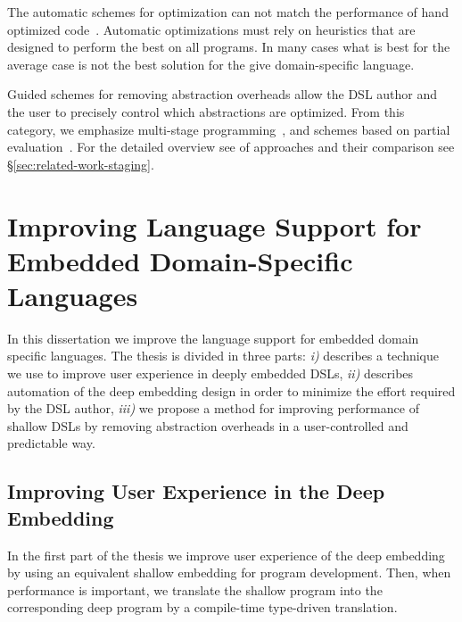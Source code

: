 The automatic schemes for optimization can not match the performance of hand optimized
 code~\cite{rompf_optimizing_2013}. Automatic optimizations must rely on heuristics that
 are designed to perform the best on all programs. In many cases what is best for the
 average case is not the best solution for the give domain-specific language.

Guided schemes for removing abstraction overheads allow the DSL author and the user
to precisely control which abstractions are optimized. From this category, we emphasize
multi-stage programming~\cite{taha_multi-stage_1997,taha2004gentle}, and schemes
based on partial evaluation~\cite{jones1993partial,brady2010scrapping}. For the detailed
overview see of approaches and their comparison see \S \ref{sec:related-work-staging}.

\section{Improving Language Support for Embedded Domain-Specific Languages}
\label{sec:improving-language-support}

In this dissertation we improve the language support for embedded domain specific languages. The
 thesis is divided in three parts: \emph{i)} describes a technique we use to improve
 user experience in deeply embedded DSLs, \emph{ii)} describes automation of the
 deep embedding design in order to minimize the effort required by the DSL author, \emph{iii)}
 we propose a method for improving performance of shallow DSLs by removing abstraction overheads
 in a user-controlled and predictable way.

\subsection{Improving User Experience in the Deep Embedding}


In the first part of the thesis we improve user experience of the deep embedding by
 using an equivalent shallow embedding for program development. Then, when performance is
 important, we translate the shallow program into the corresponding deep program
 by a compile-time type-driven translation.

